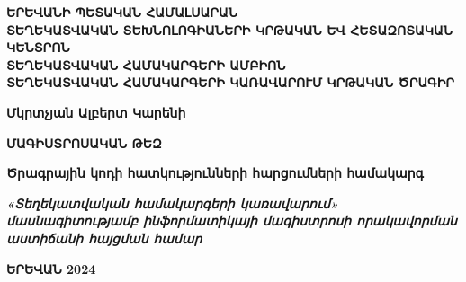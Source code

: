 \begin{titlepage}
    \begin{center}
    	\linespread{1.3}
        \vspace{0.5cm}
        \Large
        \textbf{ԵՐԵՎԱՆԻ ՊԵՏԱԿԱՆ ՀԱՄԱԼՍԱՐԱՆ}\\
        \vspace{1.5cm}
        \textbf{ՏԵՂԵԿԱՏՎԱԿԱՆ ՏԵԽՆՈԼՈԳԻԱՆԵՐԻ ԿՐԹԱԿԱՆ ԵՎ ՀԵՏԱԶՈՏԱԿԱՆ ԿԵՆՏՐՈՆ}\\
        
        \vspace{1cm}
        \textbf{ՏԵՂԵԿԱՏՎԱԿԱՆ ՀԱՄԱԿԱՐԳԵՐԻ ԱՄԲԻՈՆ}\\ 
        \vspace{1cm}
        \textbf{ՏԵՂԵԿԱՏՎԱԿԱՆ ՀԱՄԱԿԱՐԳԵՐԻ ԿԱՌԱՎԱՐՈՒՄ ԿՐԹԱԿԱՆ ԾՐԱԳԻՐ}
        
        \vspace{1cm}
        \textbf{Մկրտչյան Ալբերտ Կարենի}
        
        \vspace{1.5cm}
        \textbf{ՄԱԳԻՍՏՐՈՍԱԿԱՆ ԹԵԶ}
        
        \vspace{1cm}
        \textbf{Ծրագրային կոդի հատկությունների հարցումների համակարգ}

        \vfill
      	\large
        \textbf{\textit{«Տեղեկատվական համակարգերի կառավարում» մասնագիտությամբ ինֆորմատիկայի մագիստրոսի որակավորման աստիճանի հայցման համար}}

        \vspace{0.5cm}

        \textbf{ԵՐԵՎԱՆ 2024}
    \end{center}
\end{titlepage}